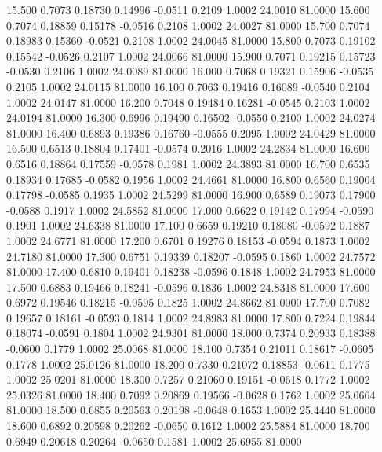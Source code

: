   15.500   0.7073   0.18730   0.14996  -0.0511   0.2109   1.0002  24.0010  81.0000
  15.600   0.7074   0.18859   0.15178  -0.0516   0.2108   1.0002  24.0027  81.0000
  15.700   0.7074   0.18983   0.15360  -0.0521   0.2108   1.0002  24.0045  81.0000
  15.800   0.7073   0.19102   0.15542  -0.0526   0.2107   1.0002  24.0066  81.0000
  15.900   0.7071   0.19215   0.15723  -0.0530   0.2106   1.0002  24.0089  81.0000
  16.000   0.7068   0.19321   0.15906  -0.0535   0.2105   1.0002  24.0115  81.0000
  16.100   0.7063   0.19416   0.16089  -0.0540   0.2104   1.0002  24.0147  81.0000
  16.200   0.7048   0.19484   0.16281  -0.0545   0.2103   1.0002  24.0194  81.0000
  16.300   0.6996   0.19490   0.16502  -0.0550   0.2100   1.0002  24.0274  81.0000
  16.400   0.6893   0.19386   0.16760  -0.0555   0.2095   1.0002  24.0429  81.0000
  16.500   0.6513   0.18804   0.17401  -0.0574   0.2016   1.0002  24.2834  81.0000
  16.600   0.6516   0.18864   0.17559  -0.0578   0.1981   1.0002  24.3893  81.0000
  16.700   0.6535   0.18934   0.17685  -0.0582   0.1956   1.0002  24.4661  81.0000
  16.800   0.6560   0.19004   0.17798  -0.0585   0.1935   1.0002  24.5299  81.0000
  16.900   0.6589   0.19073   0.17900  -0.0588   0.1917   1.0002  24.5852  81.0000
  17.000   0.6622   0.19142   0.17994  -0.0590   0.1901   1.0002  24.6338  81.0000
  17.100   0.6659   0.19210   0.18080  -0.0592   0.1887   1.0002  24.6771  81.0000
  17.200   0.6701   0.19276   0.18153  -0.0594   0.1873   1.0002  24.7180  81.0000
  17.300   0.6751   0.19339   0.18207  -0.0595   0.1860   1.0002  24.7572  81.0000
  17.400   0.6810   0.19401   0.18238  -0.0596   0.1848   1.0002  24.7953  81.0000
  17.500   0.6883   0.19466   0.18241  -0.0596   0.1836   1.0002  24.8318  81.0000
  17.600   0.6972   0.19546   0.18215  -0.0595   0.1825   1.0002  24.8662  81.0000
  17.700   0.7082   0.19657   0.18161  -0.0593   0.1814   1.0002  24.8983  81.0000
  17.800   0.7224   0.19844   0.18074  -0.0591   0.1804   1.0002  24.9301  81.0000
  18.000   0.7374   0.20933   0.18388  -0.0600   0.1779   1.0002  25.0068  81.0000
  18.100   0.7354   0.21011   0.18617  -0.0605   0.1778   1.0002  25.0126  81.0000
  18.200   0.7330   0.21072   0.18853  -0.0611   0.1775   1.0002  25.0201  81.0000
  18.300   0.7257   0.21060   0.19151  -0.0618   0.1772   1.0002  25.0326  81.0000
  18.400   0.7092   0.20869   0.19566  -0.0628   0.1762   1.0002  25.0664  81.0000
  18.500   0.6855   0.20563   0.20198  -0.0648   0.1653   1.0002  25.4440  81.0000
  18.600   0.6892   0.20598   0.20262  -0.0650   0.1612   1.0002  25.5884  81.0000
  18.700   0.6949   0.20618   0.20264  -0.0650   0.1581   1.0002  25.6955  81.0000
